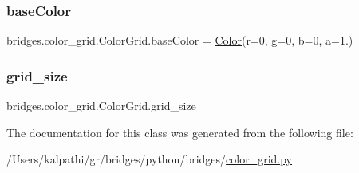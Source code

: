 \subsubsection{\texorpdfstring{baseColor}{baseColor}}
{\footnotesize\ttfamily bridges.\+color\+\_\+grid.\+Color\+Grid.\+base\+Color = \mbox{\hyperlink{classbridges_1_1color_1_1_color}{Color}}(r=0, g=0, b=0, a=1.)\hspace{0.3cm}{\ttfamily [static]}}

\mbox{\label{classbridges_1_1color__grid_1_1_color_grid_af248634de8b3d7b92feef01eed40821b}} 
\subsubsection{\texorpdfstring{grid\_size}{grid\_size}}
{\footnotesize\ttfamily bridges.\+color\+\_\+grid.\+Color\+Grid.\+grid\+\_\+size}



The documentation for this class was generated from the following file\+:\begin{DoxyCompactItemize}
\item 
/\+Users/kalpathi/gr/bridges/python/bridges/\mbox{\hyperlink{color__grid_8py}{color\+\_\+grid.\+py}}\end{DoxyCompactItemize}
